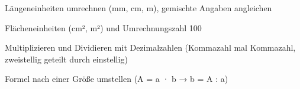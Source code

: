 \setcounter{aufgabe}{0}

\begin{aufgabe}{Längeneinheiten umrechnen (mm, cm, m), gemischte Angaben angleichen}
\end{aufgabe}

\begin{aufgabe}{Flächeneinheiten (cm², m²) und Umrechnungszahl 100}
\end{aufgabe}

\begin{aufgabe}{Multiplizieren und Dividieren mit Dezimalzahlen (Kommazahl mal Kommazahl, zweistellig geteilt durch einstellig)}
\end{aufgabe}

\begin{aufgabe}{Formel nach einer Größe umstellen (A = a · b → b = A : a)}
\end{aufgabe}

